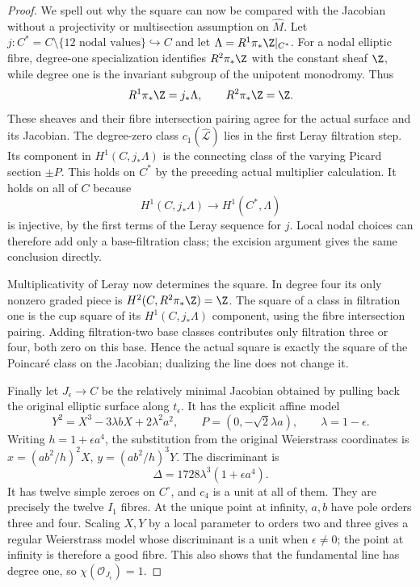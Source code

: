 \begin{proof}
We spell out why the square can now be compared with the
Jacobian without a projectivity or multisection assumption on
$\widehat M$. Let $j:C^*=C\setminus\{12\text{ nodal values}\}
\hookrightarrow C$ and let $\Lambda=R^1\pi_*\Z|_{C^*}$.
For a nodal elliptic fibre, degree-one specialization identifies
$R^2\pi_*\Z$ with the constant sheaf $\Z$, while degree one
is the invariant subgroup of the unipotent monodromy. Thus
\[
 R^1\pi_*\Z=j_*\Lambda,\qquad R^2\pi_*\Z=\Z.
\]
These sheaves and their fibre intersection pairing agree for
the actual surface and its Jacobian. The degree-zero class
$c_1(\widehat{\mathcal L})$ lies in the first Leray filtration
step. Its component in
$H^1(C,j_*\Lambda)$ is the connecting class of the varying
Picard section $\pm P$. This holds on $C^*$ by the preceding
actual multiplier calculation. It holds on all of $C$ because
\[
 H^1(C,j_*\Lambda)\longrightarrow H^1(C^*,\Lambda)
\]
is injective, by the first terms of the Leray sequence for $j$.
Local nodal choices can therefore add only a base-filtration
class; the excision argument gives the same conclusion directly.

Multiplicativity of Leray now determines the square. In degree
four its only nonzero graded piece is
$H^2(C,R^2\pi_*\Z)=\Z$. The square of a class in filtration
one is the cup square of its $H^1(C,j_*\Lambda)$ component,
using the fibre intersection pairing. Adding filtration-two
base classes contributes only filtration three or four, both
zero on this base. Hence the actual square is exactly the
square of the Poincar\'e class on the Jacobian; dualizing the
line does not change it.

Finally let $J_\epsilon\to C$ be the relatively minimal
Jacobian obtained by pulling back the original elliptic surface
along $t_\epsilon$. It has the explicit affine model
\[
 Y^2=X^3-3\lambda bX+2\lambda^2a^2,
 \qquad P=(0,-\sqrt2\lambda a),\qquad
 \lambda=1-\epsilon.
\]
Writing $h=1+\epsilon a^4$, the substitution from the original
Weierstrass coordinates is
$x=(ab^2/h)^2X$, $y=(ab^2/h)^3Y$.
The discriminant is
\[
 \Delta=1728\lambda^3(1+\epsilon a^4).
\]
It has twelve simple zeroes on $C^\circ$, and $c_4$ is a unit
at all of them. They are precisely the twelve $I_1$ fibres.
At the unique point at infinity, $a,b$ have pole orders
three and four. Scaling $X,Y$ by a local parameter to orders
two and three gives a regular Weierstrass model whose
discriminant is a unit when $\epsilon\ne0$; the point at
infinity is therefore a good fibre. This also shows that the
fundamental line has degree one, so
$\chi(\mathcal O_{J_\epsilon})=1$.


\end{proof}
